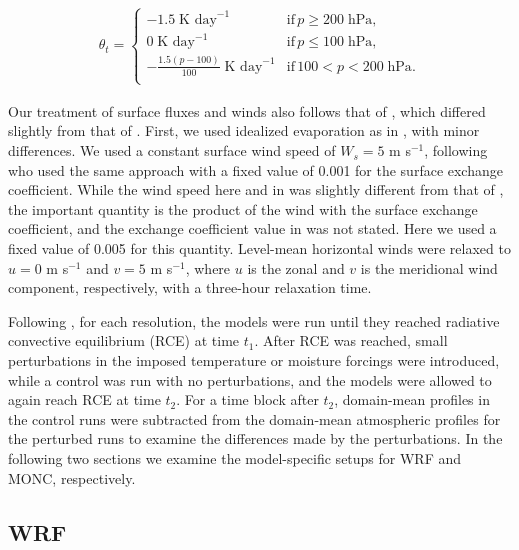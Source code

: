 \documentclass[draft]{agujournal2019}
\begin{document}
\begin{align}
 \theta_t = \begin{cases}
    -1.5\; \textrm{K day}^{-1} & \textrm{if}\, p \geq 200\; \textrm{hPa}, \\
    0\; \textrm{K day}^{-1} & \textrm{if}\, p \leq 100\; \textrm{hPa}, \\
    -\frac{1.5 (p-100)}{100}\; \textrm{K day}^{-1} & \textrm{if}\, 100 < p < 200\; \textrm{hPa}. \\
 \end{cases}
\end{align}

Our treatment of surface fluxes and winds also follows that of
, which differed slightly from that of
. First, we used idealized evaporation as in
, with minor differences. We used a constant surface wind
speed of $W_s = 5$ m s$^{-1}$, following  who used the
same approach with a fixed value of 0.001 for the surface exchange coefficient.
While the wind speed here and in  was slightly different
from that of , the important quantity is the product of
the wind with the surface exchange coefficient, and the exchange coefficient
value in  was not stated. Here we used a fixed value of
0.005 for this quantity. Level-mean horizontal winds were relaxed to $u = 0$ m
s$^{-1}$ and $v = 5$ m s$^{-1}$, where $u$ is the zonal and $v$ is the
meridional wind component, respectively, with a three-hour relaxation time.

Following \cite{Kuang_JAS_2010}, for each resolution, the models were run until
they reached radiative convective equilibrium (RCE) at time $t_1$. After RCE was
reached, small perturbations in the imposed temperature or moisture forcings
were introduced, while a control was run with no perturbations, and the models
were allowed to again reach RCE at time $t_2$. For a time block after $t_2$,
domain-mean profiles in the control runs were subtracted from the  domain-mean
atmospheric profiles for the perturbed runs to examine the differences made by
the perturbations. In the following two sections we examine the model-specific
setups for WRF and MONC, respectively.

\subsection{WRF}
\end{document}
